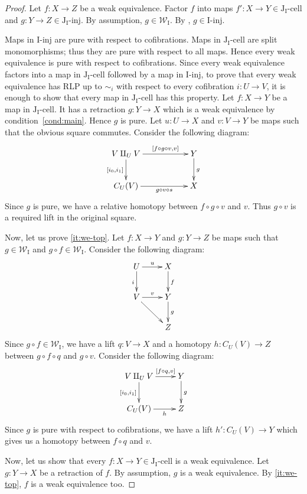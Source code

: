 \documentclass[reqno]{amsart}
\theoremstyle{definition}
\newcommand{\we}{\mathcal{W}}
\newcommand{\I}{\mathrm{I}}
\newcommand{\J}{\mathrm{J}}
\newcommand{\class}[2]{#1\text{-}\mathrm{#2}}
\newcommand{\Iinj}[1][\I]{\class{#1}{inj}}
\newcommand{\Icell}[1][\I]{\class{#1}{cell}}
\newcommand{\Jinj}[1][]{\Iinj[\J#1]}
\newcommand{\Jcell}[1][]{\Icell[\J#1]}
\newcommand{\cyli}{i}
\begin{document}
\begin{proof}
Let $f : X \to Z$ be a weak equivalence.
Factor $f$ into maps $f' : X \to Y \in \Jcell[_\I]$ and $g : Y \to Z \in \Jinj[_\I]$.
By assumption, $g \in \we_\I$.
By , $g \in \Iinj$.

Maps in $\Iinj$ are pure with respect to cofibrations.
Maps in $\Jcell[_\I]$ are split monomorphisms; thus they are pure with respect to all maps.
Hence every weak equivalence is pure with respect to cofibrations.
Since every weak equivalence factors into a map in $\Jcell[_\I]$ followed by a map in $\Iinj$,
to prove that every weak equivalence has RLP up to $\sim_i$ with respect to every cofibration $i : U \to V$,
it is enough to show that every map in $\Jcell[_\I]$ has this property.
Let $f : X \to Y$ be a map in $\Jcell[_\I]$.
It has a retraction $g : Y \to X$ which is a weak equivalence by condition~\eqref{cond:main}.
Hence $g$ is pure.
Let $u : U \to X$ and $v : V \to Y$ be maps such that the obvious square commutes.
Consider the following diagram:
\[ \xymatrix{ V \amalg_U V \ar[rr]^-{[f \circ g \circ v, v]} \ar[d]_{[\cyli_0,\cyli_1]} & & Y \ar[d]^g \\
              C_U(V) \ar[rr]_-{g \circ v \circ s} & & X
            } \]
Since $g$ is pure, we have a relative homotopy between $f \circ g \circ v$ and $v$.
Thus $g \circ v$ is a required lift in the original square.

Now, let us prove \eqref{it:we-top}.
Let $f : X \to Y$ and $g : Y \to Z$ be maps such that $g \in \we_\I$ and $g \circ f \in \we_\I$.
Consider the following diagram:
\[ \xymatrix{ U \ar[r]^u \ar[d]_i & X \ar[d]^f \\
              V \ar[r]^v \ar[rd]  & Y \ar[d]^g \\
                                  & Z
            } \]
Since $g \circ f \in \we_\I$, we have a lift $q : V \to X$ and a homotopy $h : C_U(V) \to Z$ between $g \circ f \circ q$ and $g \circ v$.
Consider the following diagram:
\[ \xymatrix{ V \amalg_U V \ar[r]^-{[f \circ q, v]} \ar[d]_{[\cyli_0,\cyli_1]} & Y \ar[d]^g \\
              C_U(V) \ar[r]_-h & Z
            } \]
Since $g$ is pure with respect to cofibrations, we have a lift $h' : C_U(V) \to Y$ which gives us a homotopy between $f \circ q$ and $v$.

Now, let us show that every $f : X \to Y \in \Jcell[_\I]$ is a weak equivalence.
Let $g : Y \to X$ be a retraction of $f$.
By assumption, $g$ is a weak equivalence.
By \eqref{it:we-top}, $f$ is a weak equivalence too.


\end{proof}
\end{document}
